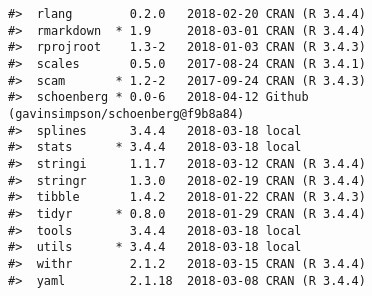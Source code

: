 \documentclass[12pt,]{article}
\begin{document}
\begin{verbatim}
#>  rlang        0.2.0   2018-02-20 CRAN (R 3.4.4)                          
#>  rmarkdown  * 1.9     2018-03-01 CRAN (R 3.4.4)                          
#>  rprojroot    1.3-2   2018-01-03 CRAN (R 3.4.3)                          
#>  scales       0.5.0   2017-08-24 CRAN (R 3.4.1)                          
#>  scam       * 1.2-2   2017-09-24 CRAN (R 3.4.3)                          
#>  schoenberg * 0.0-6   2018-04-12 Github (gavinsimpson/schoenberg@f9b8a84)
#>  splines      3.4.4   2018-03-18 local                                   
#>  stats      * 3.4.4   2018-03-18 local                                   
#>  stringi      1.1.7   2018-03-12 CRAN (R 3.4.4)                          
#>  stringr      1.3.0   2018-02-19 CRAN (R 3.4.4)                          
#>  tibble       1.4.2   2018-01-22 CRAN (R 3.4.3)                          
#>  tidyr      * 0.8.0   2018-01-29 CRAN (R 3.4.4)                          
#>  tools        3.4.4   2018-03-18 local                                   
#>  utils      * 3.4.4   2018-03-18 local                                   
#>  withr        2.1.2   2018-03-15 CRAN (R 3.4.4)                          
#>  yaml         2.1.18  2018-03-08 CRAN (R 3.4.4)
\end{verbatim}
\end{document}

